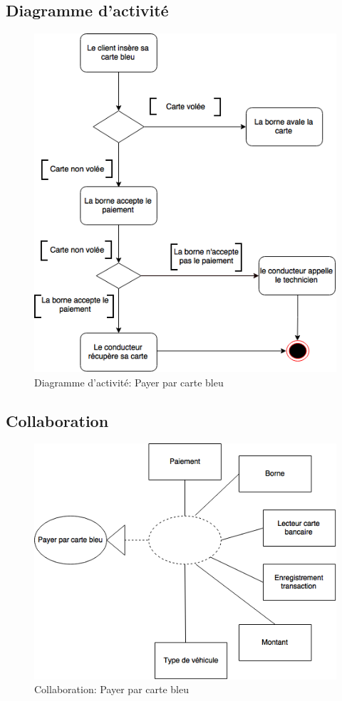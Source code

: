 \subsection{Diagramme d'activité}
\begin{figure}[h]
    \centering
    \includegraphics[scale=0.8]{02_Desenvolvimento/TD2/images/DAPayeBleu.png}
    \caption{Diagramme d'activité: Payer par carte bleu}
\end{figure}
\newpage
\subsection{Collaboration}
\begin{figure}[h]
    \centering
    \includegraphics[scale=0.6]{02_Desenvolvimento/TD2/images/ColaCarteBleu.png}
    \caption{Collaboration: Payer par carte bleu}
\end{figure}